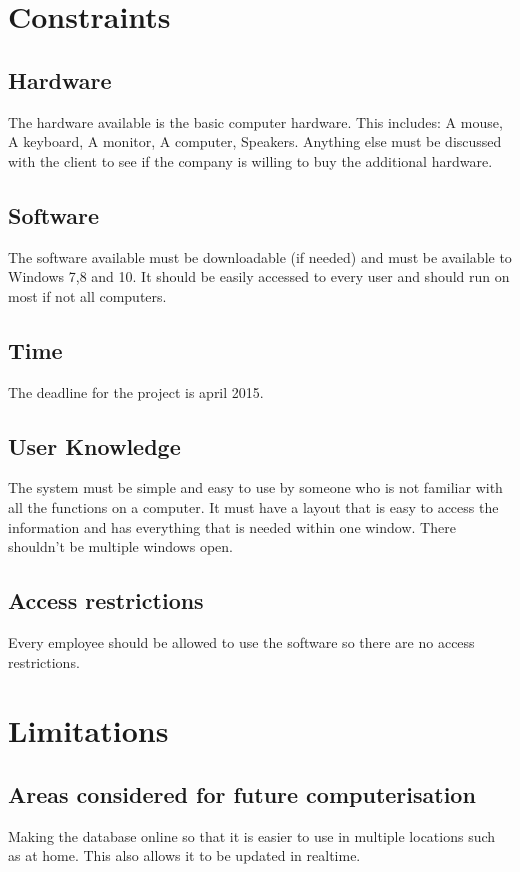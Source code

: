 \section{Constraints}

\subsection{Hardware}
The hardware available is the basic computer hardware. This includes: A mouse, A keyboard, A monitor, A computer, Speakers. Anything else must be discussed with the client to see if the company is willing to buy the additional hardware.

\subsection{Software}
The software available must be downloadable (if needed) and must be available to Windows 7,8 and 10. It should be easily accessed to every user and should run on most if not all computers.
\subsection{Time}
The deadline for the project is april 2015.
\subsection{User Knowledge}
The system must be simple and easy to use by someone who is not familiar with all the functions on a computer. It must have a layout that is easy to access the information and has everything that is needed within one window. There shouldn't be multiple windows open.
\subsection{Access restrictions}
Every employee should be allowed to use the software so there are no access restrictions.

\section{Limitations}

\subsection{Areas considered for future computerisation}
Making the database online so that it is easier to use in multiple locations such as at home. This also allows it to be updated in realtime.

